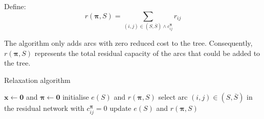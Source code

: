\begin{defn} \label{defn:relax-tree-residual}
Define:
\begin{equation} \label{eq:relax-tree-residual}
r(\boldsymbol{\pi},S) = \sum_{(i,j) \in \left(S,\overline{S}\right) \land c_{ij}^{\boldsymbol{\pi}}} r_{ij}
\end{equation}
\end{defn}

\begin{remark}
The algorithm only adds arcs with zero reduced cost to the tree. Consequently, $r(\boldsymbol{\pi},S)$ represents the total residual capacity of the arcs that could be added to the tree.
\end{remark}

\begin{algorithm}
    \caption{Relaxation algorithm}
    \label{algo:relaxation}
    \begin{algorithmic}[1]
        \State $\mathbf{x} \gets \mathbf{0}$ and $\boldsymbol{\pi} \gets \mathbf{0}$ \label{algo:relaxation:initialisation}
         \label{algo:relaxation:outer-loop-start}
        \State initialise $e(S)$ and $r(\boldsymbol{\pi},S)$
         \label{algo:relaxation:first-update-potentials}
        \EndIf
        \label{algo:relaxation:inner-loop-start}
        \State select arc $(i,j) \in \left(S,\overline{S}\right)$ in the residual network with $c_{ij}^{\boldsymbol{\pi}}=0$ \label{algo:relaxation:select-arc}
         \label{algo:relaxation:if-source}
         \label{algo:relaxation:update-predecessor}
         \label{algo:relaxation:add-node}
        \State update $e(S)$ and $r(\boldsymbol{\pi},S)$ 
        \label{algo:relaxation:end-if-source}
        \Else
        \State {} \label{algo:relaxation:augment}
        \Break
        \EndIf
        \EndWhile \label{algo:relaxation:inner-loop-end}
         \label{algo:relaxation:second-update-potentials}
        \EndIf
        \EndWhile \label{algo:relaxation:outer-loop-end}
    \end{algorithmic}
\end{algorithm}


